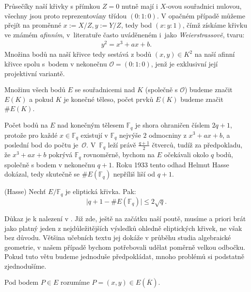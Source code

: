 \documentclass [12pt]{report}
\begin{document}
Průsečíky naší křivky s přímkou $Z=0$ nutně mají i $X$-ovou souřadnici nulovou, všechny jsou proto reprezentovány třídou $(0:1:0)$. V opačném případě můžeme přejít na proměnné $x := X/Z, y:= Y/Z$, tedy bod $(x:y:1)$, čímž získáme křivku ve známém \textit{afinním}, v~literatuře  často uváděneném i~jako \textit{Weierstrassově}, tvaru:
\begin{align*}
y^2 = x^3+ax+b.
\end{align*}
Množina bodů na naší křivce tedy sestává z bodů $(x,y) \in K^2$ na naší afinní křivce spolu s~bodem v nekonečnu $\mathcal{O} = (0:1:0)$, jenž je exklusivní její projektivní variantě.

\begin{znaceni}
Množinu všech bodů $E$ se souřadnicemi nad $K$ (společně s $\mathcal{O}$) budeme značit $E(K)$ a pokud $K$ je konečné těleso, počet prvků $E(K)$ budeme značit $\# E(K)$.
\end{znaceni}

Počet bodů na $E$ nad konečným tělesem $\mathbb{F}_q$ je shora ohraničen číslem $2q+1$, protože pro každé $x \in \mathbb{F}_q$ existují v $\mathbb{F}_q$ nejvýše $2$ odmocniny z $x^3+ax+b$, a poslední bod do počtu je~$\mathcal{O}$. V~$\mathbb{F}_q$ leží právě $\frac{q+1}{2}$ čtverců, tudíž za předpokladu, že $x^3+ax+b$ pokrývá $\mathbb{F}_q$ rovnoměrně, bychom na $E$ očekávali okolo $q$ bodů, společně s bodem v nekonečnu $q+1$. Roku 1933 tento odhad Helmut Hasse dokázal, tedy skutečně se $\# E(\mathbb{F}_q)$ nepříliš liší od $q+1$.
\begin{veta}(Hasse)\label{Hasse}
Nechť $E/\mathbb{F}_q$ je eliptická křivka. Pak:
\begin{equation*}
\vert q+1 - \# E(\mathbb{F}_q) \vert \leqslant 2\sqrt{q}.
\end{equation*}
\end{veta}
 Důkaz je k nalezení v \cite[Thm. V.1.1]{Silverman}. Již zde, ještě na začátku naší poutě, musíme a priori brát jako platný jeden z nejdůležitějších výsledků ohledně eliptických křivek, ne však bez důvodu. Většina učebních textu jej dokáže v průběhu studia algebraické geometrie, v našem případě bychom potřebovali udělat poměrně velkou odbočku. Pokud tuto větu budeme jednoduše předpokládat, mnoho problémů si podstatně zjednodušíme.  



\begin{znaceni}
Pod bodem $P \in E$ rozumíme $P = (x,y) \in E(\overline{K})$.
\end{znaceni}
\end{document}
